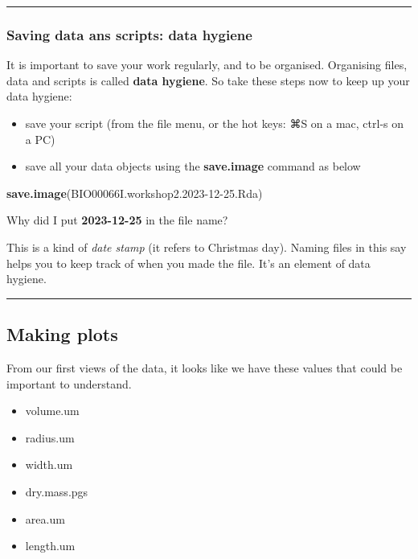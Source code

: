 \documentclass[
]{article}
\newenvironment{Shaded}{\begin{snugshade}}{\end{snugshade}}
\newcommand{\FunctionTok}[1]{\textcolor[rgb]{0.13,0.29,0.53}{\textbf{#1}}}
\newcommand{\NormalTok}[1]{#1}
\newcommand{\StringTok}[1]{\textcolor[rgb]{0.31,0.60,0.02}{#1}}
\providecommand{\tightlist}{%
  \setlength{\itemsep}{0pt}\setlength{\parskip}{0pt}}
\begin{document}
\begin{center}\rule{0.5\linewidth}{0.5pt}\end{center}

\hypertarget{saving-data-ans-scripts-data-hygiene}{%
\subsubsection{Saving data ans scripts: data
hygiene}\label{saving-data-ans-scripts-data-hygiene}}

It is important to save your work regularly, and to be organised.
Organising files, data and scripts is called \textbf{data hygiene}. So
take these steps now to keep up your data hygiene:

\begin{itemize}
\tightlist
\item
  save your script (from the file menu, or the hot keys: ⌘S on a mac,
  ctrl-s on a PC)
\item
  save all your data objects using the \textbf{save.image} command as
  below
\end{itemize}

\begin{Shaded}
\begin{Highlighting}[]
\FunctionTok{save.image}\NormalTok{(}\StringTok{\textquotesingle{}BIO00066I.workshop2.2023{-}12{-}25.Rda\textquotesingle{}}\NormalTok{)}
\end{Highlighting}
\end{Shaded}

Why did I put \textbf{2023-12-25} in the file name?

This is a kind of \emph{date stamp} (it refers to Christmas day). Naming
files in this say helps you to keep track of when you made the file.
It's an element of data hygiene.

\begin{center}\rule{0.5\linewidth}{0.5pt}\end{center}

\hypertarget{making-plots}{%
\subsection{Making plots}\label{making-plots}}

From our first views of the data, it looks like we have these values
that could be important to understand.

\begin{itemize}
\tightlist
\item
  volume.um
\item
  radius.um
\item
  width.um
\item
  dry.mass.pgs
\item
  area.um
\item
  length.um
\end{itemize}
\end{document}
